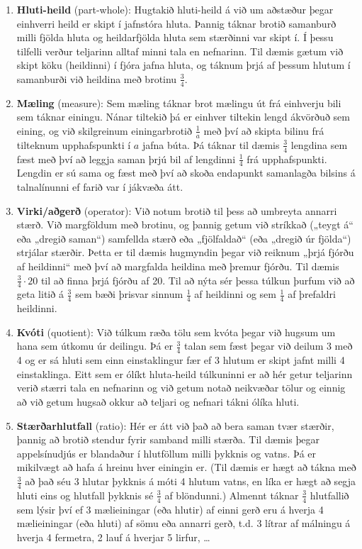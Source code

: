 \documentclass[
  icelandic,
]{book}
\providecommand{\tightlist}{%
  \setlength{\itemsep}{0pt}\setlength{\parskip}{0pt}}
\theoremstyle{definition}
\theoremstyle{definition}
\theoremstyle{definition}
\theoremstyle{definition}
\theoremstyle{remark}
\begin{document}
\begin{enumerate}
\def\labelenumi{\alph{enumi}.}
\tightlist
\item
  \textbf{Hluti-heild} (part-whole): Hugtakið hluti-heild á við um aðstæður þegar einhverri heild er skipt í jafnstóra hluta. Þannig táknar brotið samanburð milli fjölda hluta og heildarfjölda hluta sem stærðinni var skipt í. Í þessu tilfelli verður teljarinn alltaf minni tala en nefnarinn. Til dæmis gætum við skipt köku (heildinni) í fjóra jafna hluta, og táknum þrjá af þessum hlutum í samanburði við heildina með brotinu \(\frac{3}{4}\).
\item
  \textbf{Mæling} (measure): Sem mæling táknar brot mælingu út frá einhverju bili sem táknar einingu. Nánar tiltekið þá er einhver tiltekin lengd ákvörðuð sem eining, og við skilgreinum einingarbrotið \(\frac{1}{a}\) með því að skipta bilinu frá tilteknum upphafspunkti í \(a\) jafna búta. Þá táknar til dæmis \(\frac{3}{4}\) lengdina sem fæst með því að leggja saman þrjú bil af lengdinni \(\frac{1}{4}\) frá upphafspunkti. Lengdin er sú sama og fæst með því að skoða endapunkt samanlagða bilsins á talnalínunni ef farið var í jákvæða átt.
\item
  \textbf{Virki/aðgerð} (operator): Við notum brotið til þess að umbreyta annarri stærð. Við margföldum með brotinu, og þannig getum við stríkkað („teygt á`` eða „dregið saman``) samfellda stærð eða „fjölfaldað`` (eða „dregið úr fjölda``) strjálar stærðir. Þetta er til dæmis hugmyndin þegar við reiknum „þrjá fjórðu af heildinni`` með því að margfalda heildina með þremur fjórðu. Til dæmis \(\frac{3}{4} \cdot 20\) til að finna þrjá fjórðu af 20. Til að nýta sér þessa túlkun þurfum við að geta litið á \(\frac{3}{4}\) sem bæði þrisvar sinnum \(\frac{1}{4}\) af heildinni og sem \(\frac{1}{4}\) af þrefaldri heildinni.
\item
  \textbf{Kvóti} (quotient): Við túlkum ræða tölu sem kvóta þegar við hugsum um hana sem útkomu úr deilingu. Þá er \(\frac{3}{4}\) talan sem fæst þegar við deilum 3 með 4 og er sá hluti sem einn einstaklingur fær ef 3 hlutum er skipt jafnt milli 4 einstaklinga. Eitt sem er ólíkt hluta-heild túlkuninni er að hér getur teljarinn verið stærri tala en nefnarinn og við getum notað neikvæðar tölur og einnig að við getum hugsað okkur að teljari og nefnari tákni ólíka hluti.
\item
  \textbf{Stærðarhlutfall} (ratio): Hér er átt við það að bera saman tvær stærðir, þannig að brotið stendur fyrir samband milli stærða. Til dæmis þegar appelsínudjús er blandaður í hlutföllum milli þykknis og vatns. Þá er mikilvægt að hafa á hreinu hver einingin er. (Til dæmis er hægt að tákna með \(\frac{3}{4}\) að það séu 3 hlutar þykknis á móti 4 hlutum vatns, en líka er hægt að segja hluti eins og hlutfall þykknis sé \(\frac{3}{4}\) af blöndunni.) Almennt táknar \(\frac{3}{4}\) hlutfallið sem lýsir því ef 3 mælieiningar (eða hlutir) af einni gerð eru á hverja 4 mælieiningar (eða hluti) af sömu eða annarri gerð, t.d. 3 lítrar af málningu á hverja 4 fermetra, 2 lauf á hverjar 5 lirfur, \ldots{}

\end{enumerate}
\end{document}
